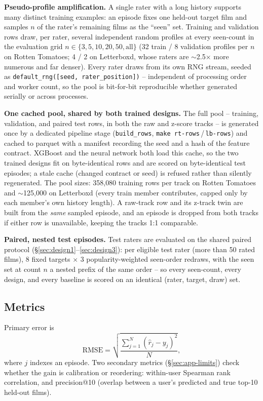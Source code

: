 \documentclass[11pt]{article}
\newcommand{\rmsen}{\mathrm{RMSE}}
\begin{document}
\textbf{Pseudo-profile amplification.} A single rater with a long history supports many distinct training examples: an episode fixes one held-out target film and samples $n$ of the rater's remaining films as the ``seen'' set. Training and validation rows draw, per rater, several independent random profiles at every seen-count in the evaluation grid $n\in\{3,5,10,20,50,\text{all}\}$ (32 train / 8 validation profiles per $n$ on Rotten Tomatoes; 4 / 2 on Letterboxd, whose raters are $\sim$2.5$\times$ more numerous and far denser). Every rater draws from its own RNG stream, seeded as \texttt{default\_rng([seed, rater\_position])} -- independent of processing order and worker count, so the pool is bit-for-bit reproducible whether generated serially or across processes.

\textbf{One cached pool, shared by both trained designs.} The full pool -- training, validation, and paired test rows, in both the raw and z-score tracks -- is generated once by a dedicated pipeline stage (\texttt{build\_rows}, \texttt{make rt-rows}\,/\,\texttt{lb-rows}) and cached to parquet with a manifest recording the seed and a hash of the feature contract. XGBoost and the neural network both load this cache, so the two trained designs fit on byte-identical rows and are scored on byte-identical test episodes; a stale cache (changed contract or seed) is refused rather than silently regenerated. The pool sizes: 358{,}080 training rows per track on Rotten Tomatoes and $\sim$125{,}000 on Letterboxd (every train member contributes, capped only by each member's own history length). A raw-track row and its z-track twin are built from the \emph{same} sampled episode, and an episode is dropped from both tracks if either row is unavailable, keeping the tracks 1:1 comparable.

\textbf{Paired, nested test episodes.} Test raters are evaluated on the shared paired protocol (\S\ref{sec:design1}--\ref{sec:design3}): per eligible test rater (more than 50 rated films), 8 fixed targets $\times$ 3 popularity-weighted seen-order redraws, with the seen set at count $n$ a nested prefix of the same order -- so every seen-count, every design, and every baseline is scored on an identical (rater, target, draw) set.

\subsection{Metrics}

Primary error is
\begin{equation}
\rmsen=\sqrt{\frac{\sum_{j=1}^{N}(\hat r_j-y_j)^2}{N}},
\label{eq:rmse}
\end{equation}
where $j$ indexes an episode. Two secondary metrics (\S\ref{sec:app-limits}) check whether the gain is calibration or reordering: within-user Spearman rank correlation, and precision@10 (overlap between a user's predicted and true top-10 held-out films).
\end{document}
